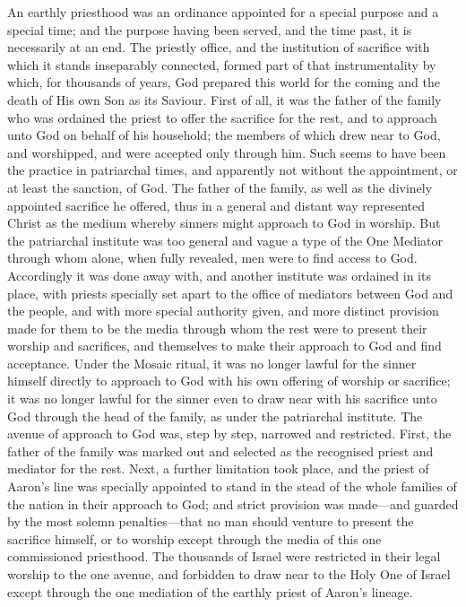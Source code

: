 \documentclass[]{book}
\begin{document}
An earthly priesthood was an ordinance appointed for a special purpose and a special time; and the purpose having been served, and the time past, it is necessarily at an end. The priestly office, and the institution of sacrifice with which it stands inseparably connected, formed part of that instrumentality by which, for thousands of years, God prepared this world for the coming and the death of His own Son as its Saviour. First of all, it was the father of the family who was ordained the priest to offer the sacrifice for the rest, and to approach unto God on behalf of his household; the members of which drew near to God, and worshipped, and were accepted only through him. Such seems to have been the practice in patriarchal times, and apparently not without the appointment, or at least the sanction, of God. The father of the family, as well as the divinely appointed sacrifice he offered, thus in a general and distant way represented Christ as the medium whereby sinners might approach to God in worship. But the patriarchal institute was too general and vague a type of the One Mediator through whom alone, when fully revealed, men were to find access to God. Accordingly it was done away with, and another institute was ordained in its place, with priests specially set apart to the office of mediators between God and the people, and with more special authority given, and more distinct provision made for them to be the media through whom the rest were to present their worship and sacrifices, and themselves to make their approach to God and find acceptance. Under the Mosaic ritual, it was no longer lawful for the sinner himself directly to approach to God with his own offering of worship or sacrifice; it was no longer lawful for the sinner even to draw near with his sacrifice unto God through the head of the family, as under the patriarchal institute. The avenue of approach to God was, step by step, narrowed and restricted. First, the father of the family was marked out and selected as the recognised priest and mediator for the rest. Next, a further limitation took place, and the priest of Aaron's line was specially appointed to stand in the stead of the whole families of the nation in their approach to God; and strict provision was made---and guarded by the most solemn penalties---that no man should venture to present the sacrifice himself, or to worship except through the media of this one commissioned priesthood. The thousands of Israel were restricted in their legal worship to the one avenue, and forbidden to draw near to the Holy One of Israel except through the one mediation of the earthly priest of Aaron's lineage.
\end{document}
